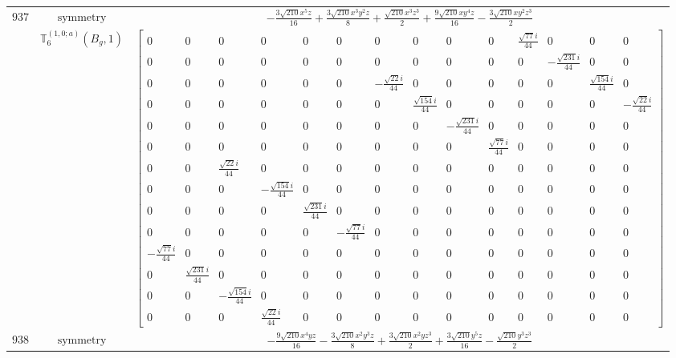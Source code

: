 \documentclass[fleqn,8pt,landscape]{jsarticle}
\begin{document}
\begin{longtable}{ccc}
$ 937 $ & $ \text{symmetry} $ & $ - \frac{3 \sqrt{210} x^{5} z}{16} + \frac{3 \sqrt{210} x^{3} y^{2} z}{8} + \frac{\sqrt{210} x^{3} z^{3}}{2} + \frac{9 \sqrt{210} x y^{4} z}{16} - \frac{3 \sqrt{210} x y^{2} z^{3}}{2} $ \\
$  $ & $ \mathbb{T}_{6}^{(1,0;a)}(B_{g},1) $ & $ \begin{bmatrix} 0 & 0 & 0 & 0 & 0 & 0 & 0 & 0 & 0 & 0 & \frac{\sqrt{77} i}{44} & 0 & 0 & 0 \\ 0 & 0 & 0 & 0 & 0 & 0 & 0 & 0 & 0 & 0 & 0 & - \frac{\sqrt{231} i}{44} & 0 & 0 \\ 0 & 0 & 0 & 0 & 0 & 0 & - \frac{\sqrt{22} i}{44} & 0 & 0 & 0 & 0 & 0 & \frac{\sqrt{154} i}{44} & 0 \\ 0 & 0 & 0 & 0 & 0 & 0 & 0 & \frac{\sqrt{154} i}{44} & 0 & 0 & 0 & 0 & 0 & - \frac{\sqrt{22} i}{44} \\ 0 & 0 & 0 & 0 & 0 & 0 & 0 & 0 & - \frac{\sqrt{231} i}{44} & 0 & 0 & 0 & 0 & 0 \\ 0 & 0 & 0 & 0 & 0 & 0 & 0 & 0 & 0 & \frac{\sqrt{77} i}{44} & 0 & 0 & 0 & 0 \\ 0 & 0 & \frac{\sqrt{22} i}{44} & 0 & 0 & 0 & 0 & 0 & 0 & 0 & 0 & 0 & 0 & 0 \\ 0 & 0 & 0 & - \frac{\sqrt{154} i}{44} & 0 & 0 & 0 & 0 & 0 & 0 & 0 & 0 & 0 & 0 \\ 0 & 0 & 0 & 0 & \frac{\sqrt{231} i}{44} & 0 & 0 & 0 & 0 & 0 & 0 & 0 & 0 & 0 \\ 0 & 0 & 0 & 0 & 0 & - \frac{\sqrt{77} i}{44} & 0 & 0 & 0 & 0 & 0 & 0 & 0 & 0 \\ - \frac{\sqrt{77} i}{44} & 0 & 0 & 0 & 0 & 0 & 0 & 0 & 0 & 0 & 0 & 0 & 0 & 0 \\ 0 & \frac{\sqrt{231} i}{44} & 0 & 0 & 0 & 0 & 0 & 0 & 0 & 0 & 0 & 0 & 0 & 0 \\ 0 & 0 & - \frac{\sqrt{154} i}{44} & 0 & 0 & 0 & 0 & 0 & 0 & 0 & 0 & 0 & 0 & 0 \\ 0 & 0 & 0 & \frac{\sqrt{22} i}{44} & 0 & 0 & 0 & 0 & 0 & 0 & 0 & 0 & 0 & 0 \end{bmatrix} $ \\ \hline
$ 938 $ & $ \text{symmetry} $ & $ - \frac{9 \sqrt{210} x^{4} y z}{16} - \frac{3 \sqrt{210} x^{2} y^{3} z}{8} + \frac{3 \sqrt{210} x^{2} y z^{3}}{2} + \frac{3 \sqrt{210} y^{5} z}{16} - \frac{\sqrt{210} y^{3} z^{3}}{2} $ \\

\end{longtable}
\end{document}
